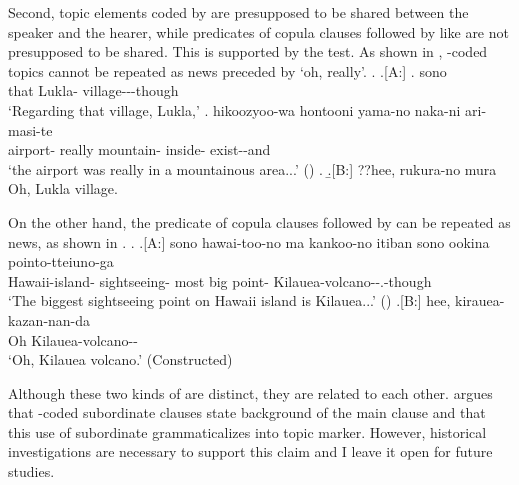 Second,
topic elements coded by  are presupposed to be shared between the speaker and the hearer,
while predicates of copula clauses followed by  like \Last are not presupposed to be shared.
This is supported by the  test.
As shown in \Next, -coded topics cannot be repeated as news preceded by  `oh, really'.
%
\ex. \a.[A:]
 \ag. sono   \\
   that Lukla- village---though \\
   `Regarding that village, Lukla,'
  \bg. hikoozyoo-wa hontooni yama-no naka-ni ari-masi-te \\
    airport- really mountain- inside- exist--and \\
    `the airport was really in a mountainous area...'
    \hfill{()}
   \z.
   \b.[B:] ??hee, rukura-no mura \\
     Oh, Lukla village.
%

On the other hand,
the predicate of copula clauses followed by  can be repeated as news, as shown in \Next.
%
\ex. \ag.[A:] sono hawai-too-no ma kankoo-no itiban sono ookina pointo-tteiuno-ga  \\
		 Hawaii-island-  sightseeing- most  big point- Kilauea-volcano--.-though \\
		`The biggest sightseeing point on Hawaii island is Kilauea...'
		\hfill{()}
	\bg.[B:] hee, kirauea-kazan-nan-da \\
	  Oh Kilauea-volcano--  \\
	  `Oh, Kilauea volcano.'
	  \hfill{(Constructed)}


Although these two kinds of  are distinct,
they are related to each other.
 argues that
-coded subordinate clauses state background of the main clause and
that this use of subordinate  grammaticalizes into topic marker.
However, historical investigations are necessary to support this claim
and I leave it open for future studies.

